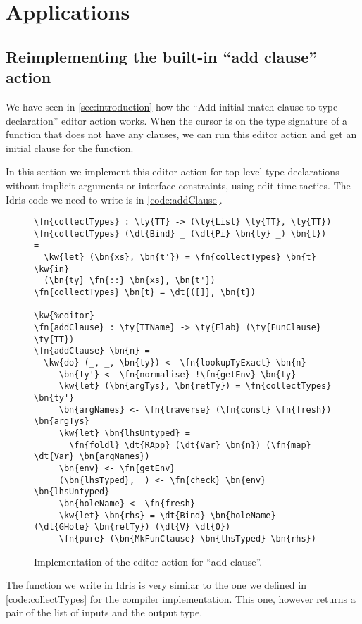 \section{Applications} \label{sec:applications}

\subsection{Reimplementing the built-in ``add clause'' action}\label{sec:addClause}

We have seen in \autoref{sec:introduction} how the ``Add initial match clause
to type declaration'' editor action works. When the cursor is on the type
signature of a function that does not have any clauses, we can run this editor
action and get an initial clause for the function.

In this section we implement this editor action for top-level type declarations
without implicit arguments or interface constraints, using edit-time tactics.
The Idris code we need to write is in \autoref{code:addClause}.

\begin{figure}[ht]
\begin{Verbatim}[framesep=2mm, label=\footnotesize{\normalfont{Idris}}, labelposition=topline]
\fn{collectTypes} : \ty{TT} -> (\ty{List} \ty{TT}, \ty{TT})
\fn{collectTypes} (\dt{Bind} _ (\dt{Pi} \bn{ty} _) \bn{t}) =
  \kw{let} (\bn{xs}, \bn{t'}) = \fn{collectTypes} \bn{t} \kw{in}
  (\bn{ty} \fn{::} \bn{xs}, \bn{t'})
\fn{collectTypes} \bn{t} = \dt{([]}, \bn{t})

\kw{%editor}
\fn{addClause} : \ty{TTName} -> \ty{Elab} (\ty{FunClause} \ty{TT})
\fn{addClause} \bn{n} =
  \kw{do} (_, _, \bn{ty}) <- \fn{lookupTyExact} \bn{n}
     \bn{ty'} <- \fn{normalise} !\fn{getEnv} \bn{ty}
     \kw{let} (\bn{argTys}, \bn{retTy}) = \fn{collectTypes} \bn{ty'}
     \bn{argNames} <- \fn{traverse} (\fn{const} \fn{fresh}) \bn{argTys}
     \kw{let} \bn{lhsUntyped} =
       \fn{foldl} \dt{RApp} (\dt{Var} \bn{n}) (\fn{map} \dt{Var} \bn{argNames})
     \bn{env} <- \fn{getEnv}
     (\bn{lhsTyped}, _) <- \fn{check} \bn{env} \bn{lhsUntyped}
     \bn{holeName} <- \fn{fresh}
     \kw{let} \bn{rhs} = \dt{Bind} \bn{holeName} (\dt{GHole} \bn{retTy}) (\dt{V} \dt{0})
     \fn{pure} (\bn{MkFunClause} \bn{lhsTyped} \bn{rhs})
\end{Verbatim}
\caption{Implementation of the editor action for ``add clause''.}
\label{code:addClause}
\end{figure}

The  function we write in Idris is very similar to the one we
defined in \autoref{code:collectTypes} for the compiler implementation. 
This one, however returns a pair of the list of inputs and the output type.

